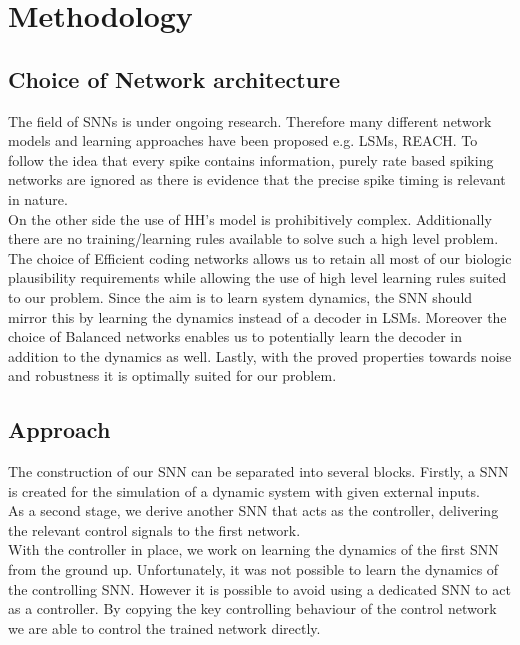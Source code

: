 \chapter{Methodology}\label{c:method}


\section{Choice of Network architecture}

The field of \acp{SNN} is under ongoing research. Therefore many different network models and learning approaches have been proposed e.g. \acp{LSM}, REACH\cite{dewolf_spiking_2016}. To follow the idea that every spike contains information, purely rate based spiking networks are ignored as there is evidence that the precise spike timing is relevant in nature\cite{brette_philosophy_2015,putney_precise_2019}.\\

On the other side the use of \ac{HH}'s model is prohibitively complex. Additionally there are no training/learning rules available to solve such a high level problem.\\
The choice of Efficient coding networks allows us to retain all most of our biologic plausibility requirements while allowing the use of high level learning rules suited to our problem. Since the aim is to learn system dynamics, the \ac{SNN} should mirror this by learning the dynamics instead of a decoder in \acp{LSM}. Moreover the choice of Balanced networks enables us to potentially learn the decoder in addition to the dynamics as well. Lastly, with the proved properties towards noise and robustness it is optimally suited for our problem.
\section{Approach}
The construction of our \ac{SNN} can be separated into several blocks. Firstly, a \ac{SNN} is created for the simulation of a dynamic system with given external inputs.\\
As a second stage, we derive another \ac{SNN} that acts as the controller, delivering the relevant control signals to the first network.\\
With the controller in place, we work on learning the dynamics of the first \ac{SNN} from the ground up. Unfortunately, it was not possible to learn the dynamics of the controlling \ac{SNN}. However it is possible to avoid using a dedicated \ac{SNN} to act as a controller. By copying the key controlling behaviour of the control network we are able to control the trained network directly.\\
